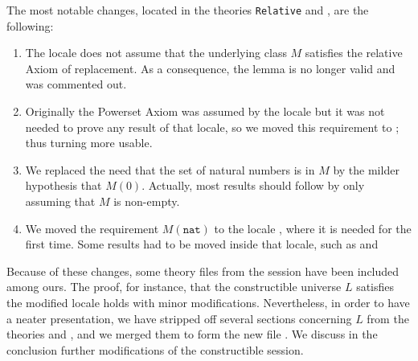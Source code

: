 The most notable changes, located in the theories \texttt{Relative}
and , are
the following:
\begin{enumerate}
\item\label{item:1} The locale 
  does not assume that the underlying class $M$ satisfies the relative
  Axiom of replacement.  As a consequence, the lemma
   is no longer valid and was commented
  out.
\item\label{item:2} Originally the Powerset Axiom was assumed by the
  locale  but it was not needed to prove any result
  of that locale, so we moved this requirement to ;
  thus turning  more usable.
\item\label{item:3} We replaced the need that the set of natural
  numbers is in $M$ by the   milder hypothesis that $M(0)$. Actually,
  most results should follow 
  by only assuming that $M$ is non-empty.
\item We moved the requirement $M(\mathtt{nat})$ to the locale
  , where it is needed for the first time. Some
  results had to be moved inside that locale, such as
   and
\end{enumerate}
Because of these changes, some theory files from the
 session have been included among ours. The
proof, for instance, that the constructible universe $L$ satisfies the
modified locale  holds with minor
modifications. Nevertheless, in order to have a neater presentation,
we have stripped off several sections concerning $L$ from the theories
 and , and we merged them to form
the new file . We discuss in the conclusion further
modifications of the constructible session.

